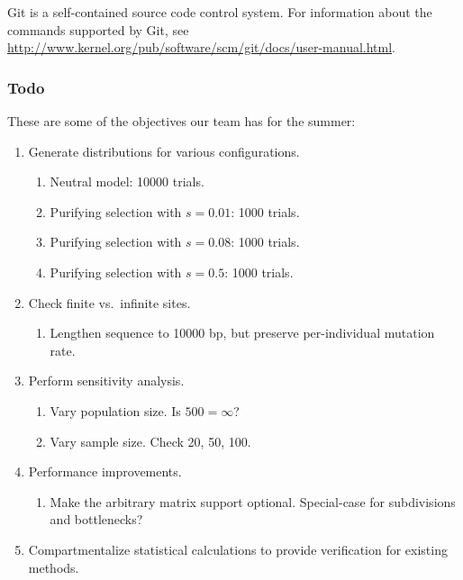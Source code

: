 \documentclass{article}
\begin{document}
        Git is a self-contained source code control system. For information
        about the commands supported by Git, see
        \url{http://www.kernel.org/pub/software/scm/git/docs/user-manual.html}.

      \subsubsection{Todo}
        \label{sec:todo}

        These are some of the objectives our team has for the summer:

        \begin{enumerate}
          \item Generate distributions for various configurations.
            \begin{enumerate}
              \item Neutral model: 10000 trials.
              \item Purifying selection with $s=0.01$: 1000 trials.
              \item Purifying selection with $s=0.08$: 1000 trials.
              \item Purifying selection with $s=0.5$: 1000 trials.
            \end{enumerate}

          \item Check finite vs.\ infinite sites.
            \begin{enumerate}
              \item Lengthen sequence to 10000 bp, but preserve per-individual
              mutation rate.
            \end{enumerate}

          \item Perform sensitivity analysis.
            \begin{enumerate}
              \item Vary population size. Is $500 = \infty$?
              \item Vary sample size. Check 20, 50, 100.
            \end{enumerate}

	  \item Performance improvements.
	    \begin{enumerate}
	      \item Make the arbitrary matrix support optional. Special-case for
	      subdivisions and bottlenecks?
	    \end{enumerate}

	  \item Compartmentalize statistical calculations to provide
	  verification for existing methods.
        \end{enumerate}
\end{document}
